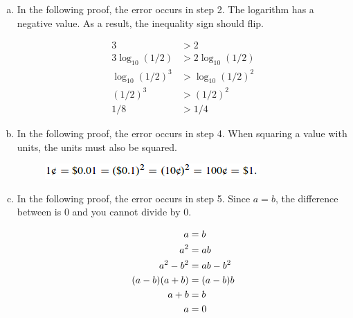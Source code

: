 \documentclass{article}
\begin{document}
\begin{enumerate}[a.]
  \item In the following proof, the error occurs in step 2. The logarithm has a
    negative value. As a result, the inequality sign should flip.

    \begin{align}
      3 &> 2 \\
      3 \log_{10} (1/2) &> 2 \log_{10} (1/2) \\
      \log_{10} (1/2)^{3} &> \log_{10} (1/2)^{2} \\
      (1/2)^{3} &> (1/2)^{2} \\
      1/8 &> 1/4
    \end{align}

  \item In the following proof, the error occurs in step 4. When squaring a
    value with units, the units must also be squared.

    \begin{figure}[H]
      \centering
      \includegraphics[scale=0.60]{"CentsBogusProof"}
    \end{figure}

  \item In the following proof, the error occurs in step 5. Since $a = b$, the
    difference between is $0$ and you cannot divide by $0$.

    \begin{align}
      \setcounter{equation}{0}
      a &= b \\
      a^{2} &= ab \\
      a^{2} - b^{2} &= ab - b^{2} \\
      (a - b)(a + b) &= (a - b)b \\
      a + b &= b \\
      a &= 0
    \end{align}

\end{enumerate}
\end{document}
